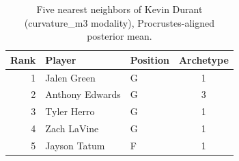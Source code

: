 \begin{table}[htbp]
  \centering\small
  \begin{tabular}{rllc}
    \toprule
    Rank & Player & Position & Archetype \\
    \midrule
    1 & Jalen Green & G & 1 \\
    2 & Anthony Edwards & G & 3 \\
    3 & Tyler Herro & G & 1 \\
    4 & Zach LaVine & G & 1 \\
    5 & Jayson Tatum & F & 1 \\
    \bottomrule
  \end{tabular}
  \caption{Five nearest neighbors of Kevin Durant (curvature_m3 modality), Procrustes-aligned posterior mean.}
  \label{tab:Kevin_Durant_neighbors_curvature_m3}
\end{table}

